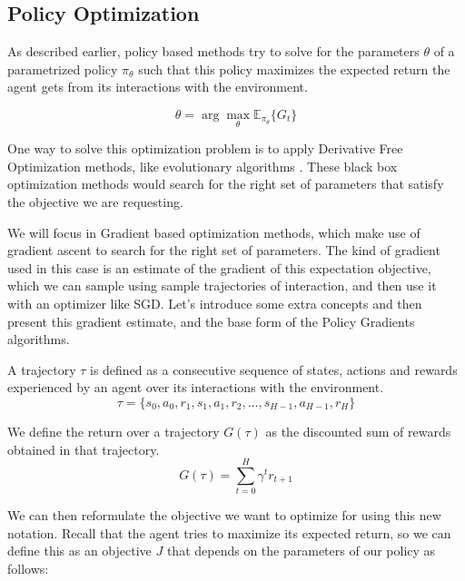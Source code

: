 \subsection{Policy Optimization}

As described earlier, policy based methods try to solve for the parameters $\theta$
of a parametrized policy $\pi_{\theta}$ such that this policy maximizes the expected
return the agent gets from its interactions with the environment.

\begin{equation}
    \theta = \arg \max_\theta \mathbb{E}_{\pi_{\theta}} \lbrace G_{t} \rbrace
\end{equation}

One way to solve this optimization problem is to apply Derivative Free Optimization
methods, like evolutionary algorithms . These black box optimization methods would
search for the right set of parameters that satisfy the objective we are requesting.

We will focus in Gradient based optimization methods, which make use of gradient
ascent to search for the right set of parameters. The kind of gradient used in this
case is an estimate of the gradient of this expectation objective, which we can sample
using sample trajectories of interaction, and then use it with an optimizer like
SGD. Let's introduce some extra concepts and then present this gradient estimate,
and the base form of the Policy Gradients algorithms.

\begin{definition}
    A trajectory $\tau$ is defined as a consecutive sequence of states, actions 
    and rewards experienced by an agent over its interactions with the environment.
    \begin{equation}
        \tau = \lbrace s_{0},a_{0},r_{1},s_{1},a_{1},r_{2},\hdots,s_{H-1},a_{H-1},r_{H} \rbrace
    \end{equation}
\end{definition}

\begin{definition}
    We define the return over a trajectory $G(\tau)$ as the discounted sum of
    rewards obtained in that trajectory.
    \begin{equation}
        G(\tau) = \sum_{t=0}^{H} \gamma^{t} r_{t+1}
    \end{equation}
\end{definition}

We  can then reformulate the objective we want to optimize for using this new notation.
Recall that the agent tries to maximize its expected return, so we can define this as
an objective $J$ that depends on the parameters of our policy as follows:


